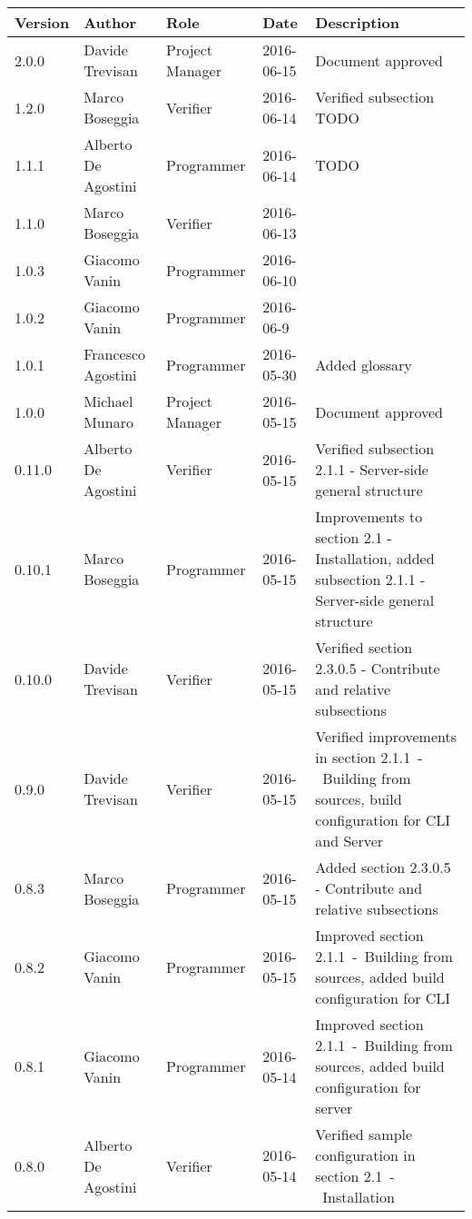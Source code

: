 \documentclass{scalatekids-article}
\begin{document}
\vspace{0cm}
\begin{center}
  \begin{longtable}{| l | l | l | l | p{5cm} |}
    \hline
    Version & Author & Role & Date & Description \\
    \hline
    2.0.0 & Davide Trevisan & Project Manager & 2016-06-15 & Document approved\\
    \hline
    1.2.0 & Marco Boseggia & Verifier & 2016-06-14 & Verified subsection TODO\\
    \hline
    1.1.1 & Alberto De Agostini & Programmer & 2016-06-14 & TODO\\
    \hline
    1.1.0 & Marco Boseggia & Verifier & 2016-06-13 & \\
    \hline
    1.0.3 & Giacomo Vanin & Programmer & 2016-06-10 & \\
    \hline
    1.0.2 & Giacomo Vanin & Programmer & 2016-06-9 & \\
    \hline
    1.0.1 & Francesco Agostini & Programmer & 2016-05-30 & Added glossary\\
    \hline
    1.0.0 & Michael Munaro & Project Manager & 2016-05-15 & Document approved\\
    \hline
    0.11.0 & Alberto De Agostini & Verifier & 2016-05-15 & Verified subsection 2.1.1 - Server-side general structure\\
    \hline
    0.10.1 & Marco Boseggia & Programmer & 2016-05-15 & Improvements to section 2.1 - Installation, added subsection 2.1.1 - Server-side general structure\\
    \hline
    0.10.0 & Davide Trevisan & Verifier & 2016-05-15 & Verified section 2.3.0.5 - Contribute and relative subsections\\
    \hline
    0.9.0 & Davide Trevisan & Verifier & 2016-05-15 & Verified improvements in section 2.1.1\ -\ Building from sources, build configuration for CLI and Server\\
    \hline
    0.8.3 & Marco Boseggia & Programmer & 2016-05-15 & Added section 2.3.0.5 - Contribute and relative subsections \\
    \hline
    0.8.2 & Giacomo Vanin & Programmer & 2016-05-15 & Improved section 2.1.1\ -\ Building from sources, added build configuration for CLI\\
    \hline
    0.8.1 & Giacomo Vanin & Programmer & 2016-05-14 & Improved section 2.1.1\ -\ Building from sources, added build configuration for server\\
    \hline
    0.8.0 & Alberto De Agostini & Verifier & 2016-05-14 & Verified sample configuration in section 2.1\ -\ Installation\\

\end{longtable}
\end{center}
\end{document}
